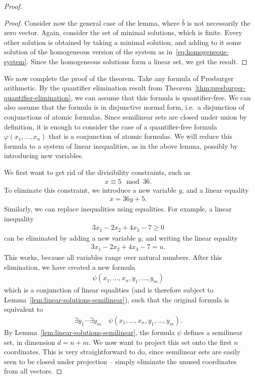 \begin{proof}
\begin{proof}
	Consider now the general case of the lemma, where $\bar b$ is not necessarily the zero vector. Again, consider the set of minimal solutions, which is finite. Every other solution is obtained by taking a minimal solution, and adding to it some solution of the homogeneous version of the system as in~\eqref{eq:homogeneous-system}. Since the homogeneous solutions form a linear set, we get the result. 
\end{proof}

We now complete the proof of the theorem. Take any formula of Presburger arithmetic. By the quantifier elimination result from Theorem~\ref{thm:presburger-quantifier-elimination}, we can assume that this formula is quantifier-free. We can also assume that the formula is in disjunctive normal form, i.e.~a disjunction of conjunctions of atomic formulas. Since semilinear sets are closed under union by definition, it is enough to consider the case of a quantifier-free formula $\varphi(x_1,\ldots,x_n)$ that is a conjunction of atomic formulas. We will reduce this formula to a system of linear inequalities, as in the above lemma, possibly by introducing new variables. 

We first want to get rid of the divisibility constraints, such as 
\begin{align*}
x \equiv 5 \mod 36.
\end{align*}
To eliminate this constraint, we  introduce a new variable $y$, and  a linear equality 
\begin{align*}
x = 36y + 5.
\end{align*}
Similarly, we can replace inequalities using equalities. For example, a linear inequality 
\begin{align*}
3x_1 - 2x_2 + 4x_3 - 7 \ge 0
\end{align*}
can be eliminated by adding a new variable $y$, and writing the linear equality
\begin{align*}
3x_1 - 2x_2 + 4x_3 - 7 = u.
\end{align*}
This works, because all variables range over natural numbers. After this elimination, we have created a new formula 
\begin{align*}
\psi(x_1,\ldots,x_n,y_1,\ldots,y_m)
\end{align*}
which is a conjunction of linear equalities (and is therefore subject to Lemma~\ref{lem:linear-solutions-semilinear}), such that the original formula is equivalent to 
\begin{align*}
\exists y_1 \cdots \exists y_m \quad \psi(x_1,\ldots,x_n,y_1,\ldots,y_m).
\end{align*}
By Lemma~\ref{lem:linear-solutions-semilinear}, the formula $\psi$ defines a semilinear set, in dimension $d=n+m$. We now want to project this set onto the first $n$ coordinates. This is very straightforward to do, since semilinear sets are easily seen to be closed under projection -- simply eliminate the unused coordinates from all vectors. 
\end{proof} 